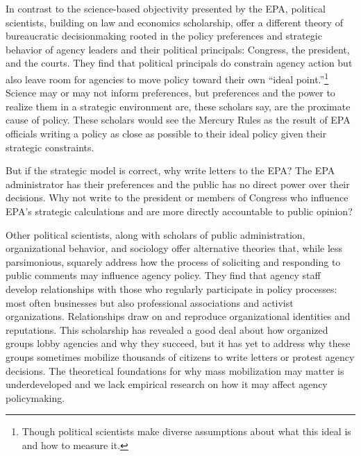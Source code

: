 
In contrast to the science-based objectivity presented by the EPA, political scientists, building on law and economics scholarship, offer a different theory of bureaucratic decisionmaking rooted in the policy preferences and strategic behavior of agency leaders and their political principals: Congress, the president, and the courts. They find that political principals do constrain agency action but also leave room for agencies to move policy toward their own ``ideal point.''\footnote{Though political scientists make diverse assumptions about what this ideal is and how to measure it.} Science may or may not inform preferences, but preferences and the power to realize them in a strategic environment are, these scholars say, are the proximate cause of policy. These scholars would see the Mercury Rules as the result of EPA officials writing a policy as close as possible to their ideal policy given their strategic constraints. 

But if the strategic model is correct, why write letters to the EPA? The EPA administrator has their preferences and the public has no direct power over their decisions. Why not write to the president or members of Congress who influence EPA's strategic calculations and are more directly accountable to public opinion? 

Other political scientists, along with scholars of public administration, organizational behavior, and sociology offer alternative theories that, while less parsimonious, squarely address how the process of soliciting and responding to public comments may influence agency policy. They find that agency staff develop relationships with those who regularly participate in policy processes: most often businesses but also professional associations and activist organizations. Relationships draw on and reproduce organizational identities and reputations. This scholarship has revealed a good deal about how organized groups lobby agencies and why they succeed, but it has yet to address why these groups sometimes mobilize thousands of citizens to write letters or protest agency decisions. The theoretical foundations for why mass mobilization may matter is underdeveloped and we lack empirical research on how it may affect agency policymaking. 

